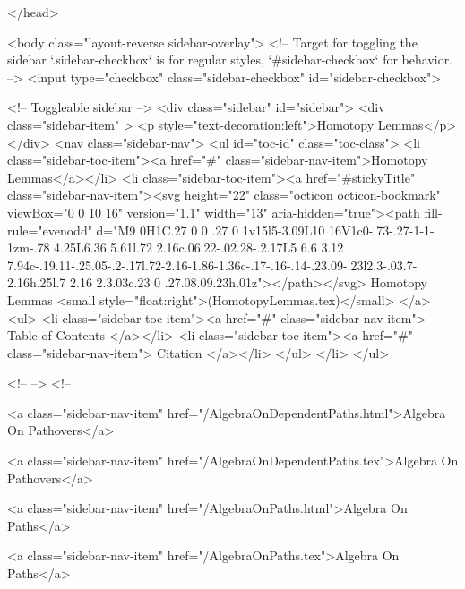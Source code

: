 </head>


  <body class="layout-reverse sidebar-overlay">
    <!-- Target for toggling the sidebar `.sidebar-checkbox` is for regular
     styles, `#sidebar-checkbox` for behavior. -->
<input type="checkbox" class="sidebar-checkbox" id="sidebar-checkbox">

<!-- Toggleable sidebar -->
<div class="sidebar" id="sidebar">
  <div class="sidebar-item" >
    <p style="text-decoration:left">Homotopy Lemmas</p>
  </div>
  <nav class="sidebar-nav">
    <ul id="toc-id" class="toc-class">
  <li class="sidebar-toc-item"><a href="#" class="sidebar-nav-item">Homotopy Lemmas</a></li>
  <li class="sidebar-toc-item"><a href="#stickyTitle" class="sidebar-nav-item"><svg height="22" class="octicon octicon-bookmark" viewBox="0 0 10 16" version="1.1" width="13" aria-hidden="true"><path fill-rule="evenodd" d="M9 0H1C.27 0 0 .27 0 1v15l5-3.09L10 16V1c0-.73-.27-1-1-1zm-.78 4.25L6.36 5.61l.72 2.16c.06.22-.02.28-.2.17L5 6.6 3.12 7.94c-.19.11-.25.05-.2-.17l.72-2.16-1.86-1.36c-.17-.16-.14-.23.09-.23l2.3-.03.7-2.16h.25l.7 2.16 2.3.03c.23 0 .27.08.09.23h.01z"></path></svg> Homotopy Lemmas <small style="float:right">(HomotopyLemmas.tex)</small>
</a>
    <ul>
      <li class="sidebar-toc-item"><a href="#" class="sidebar-nav-item"> Table of Contents </a></li>
      <li class="sidebar-toc-item"><a href="#" class="sidebar-nav-item"> Citation </a></li>
    </ul>
  </li>
</ul>


    <!--  -->
    <!-- 
      
    
      
    
      
    
      
        
      
    
      
        
          <a class="sidebar-nav-item" href="/AlgebraOnDependentPaths.html">Algebra On Pathovers</a>
        
      
    
      
        
          <a class="sidebar-nav-item" href="/AlgebraOnDependentPaths.tex">Algebra On Pathovers</a>
        
      
    
      
        
          <a class="sidebar-nav-item" href="/AlgebraOnPaths.html">Algebra On Paths</a>
        
      
    
      
        
          <a class="sidebar-nav-item" href="/AlgebraOnPaths.tex">Algebra On Paths</a>
        
